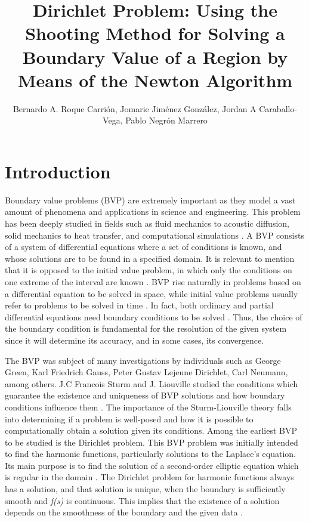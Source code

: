 \documentclass{article}
\begin{document}
\title{Dirichlet Problem: Using the Shooting Method for Solving a Boundary Value of a Region by Means of the Newton Algorithm}
\author{Bernardo A. Roque Carri\'{o}n, Jomarie Jim\'{e}nez Gonz\'{a}lez, 
    Jordan A Caraballo-Vega, Pablo Negr\'{o}n Marrero}
\maketitle %
\section{Introduction}

Boundary value problems (BVP) are extremely important as they model a vast amount of phenomena and applications in science and engineering. This problem has been deeply studied in fields such as fluid mechanics to acoustic diffusion, solid mechanics to heat transfer, and computational simulations \cite{Gustafson}. A BVP consists of a system of differential equations where a set of conditions is known, and whose solutions are to be found in a specified domain. It is relevant to mention that it is opposed to the initial value problem, in which only the conditions on one extreme of the interval are known \cite{Gustafson}. BVP rise naturally in problems based on a differential equation to be solved in space, while initial value problems usually refer to problems to be solved in time \cite{Gustafson}. In fact, both ordinary and partial differential equations need boundary conditions to be solved \cite{Lutzen}. Thus, the choice of the boundary condition is fundamental for the resolution of the given system since it will determine its accuracy, and in some cases, its convergence. 

The BVP was subject of many investigations by individuals such as George Green, Karl Friedrich Gauss, Peter Gustav Lejeune Dirichlet, Carl Neumann, among others. J.C Francois Sturm and J. Liouville studied the conditions which guarantee the existence and uniqueness of BVP solutions and how boundary conditions influence them \cite{Lutzen}. The importance of the Sturm-Liouville theory falls into determining if a problem is well-posed and how it is possible to computationally obtain a solution given its conditions. Among the earliest BVP to be studied is the Dirichlet problem. This BVP problem was initially intended to find the harmonic functions, particularly solutions to the Laplace's equation. Its main purpose is to find the solution of a second-order elliptic equation which is regular in the domain \cite{Rajurkar}. The Dirichlet problem for harmonic functions always has a solution, and that solution is unique, when the boundary is sufficiently smooth and \textit{f(s)} is continuous. This implies that the existence of a solution depends on the smoothness of the boundary and the given data \cite{Yanushauskas}.
\end{document}
